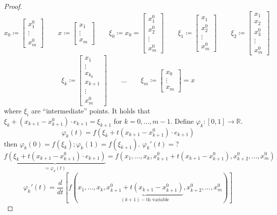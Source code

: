 \documentclass{article}
\begin{document}
\begin{proof}
  \[
    x_0 \coloneqq \begin{bmatrix} x_1^0 \\ \vdots \\ x_m^0 \end{bmatrix} \qquad
    x \coloneqq \begin{bmatrix} x_1 \\ \vdots \\ x_m \end{bmatrix} \qquad
    \xi_0 \coloneqq x_0 = \begin{bmatrix} x_1^0 \\ x_2^0 \\ \vdots \\ x_m^0 \end{bmatrix} \qquad
    \xi_1 \coloneqq \begin{bmatrix} x_1 \\ x_2^0 \\ \vdots \\ x_m^0 \end{bmatrix} \qquad
    \xi_2 \coloneqq \begin{bmatrix} x_1 \\ x_2 \\ x_3^0 \\ \vdots \\ x_m^0 \end{bmatrix} \qquad
  \] \[
    \xi_k \coloneqq \begin{bmatrix} x_1 \\ \vdots \\ x_{k_0} \\ x_{k+1} \\ \vdots \\ x_m^0 \end{bmatrix} \qquad
    \dots \qquad
    \xi_m \coloneqq \begin{bmatrix} x_0 \\ \vdots \\ x_m \end{bmatrix} = x
  \]
  where $\xi_i$ are \enquote{intermediate} points.
  It holds that $\xi_k + (x_{k+1} - x_{k+1}^0) \cdot e_{k+1} = \xi_{k+1}$ for $k = 0, \dots, m-1$.
  Define $\varphi_k: [0,1] \to \mathbb R$.
  \[ \varphi_k(t) = f(\xi_k + t(x_{k+1} - x_{k+1}^0) \cdot e_{k+1}) \]
  then $\varphi_k(0) = f(\xi_k); \varphi_k(1) = f(\xi_{k+1})$. $\varphi_k'(t) = $?
  \[ \underbrace{f(\xi_k + t(x_{k+1} - x_{k+1}^0) \cdot e_{k+1})}_{= \varphi_k(t)} = f(x_1, \dots, x_k, x_{k+1}^0 + t(x_{k+1} - x_{k+1}^0), x_{k+2}^0, \dots, x_m^0) \]
  \[ \varphi_k'(t) = \frac{d}{dt} \left[f(x_1, \dots, x_k, \underbrace{x_{k+1}^0 + t(x_{k+1} - x_{k+1}^0)}_{(k+1)-\text{th variable}}, x_{k+2}^0, \dots, x_m^0)\right] \]

\end{proof}
\end{document}
